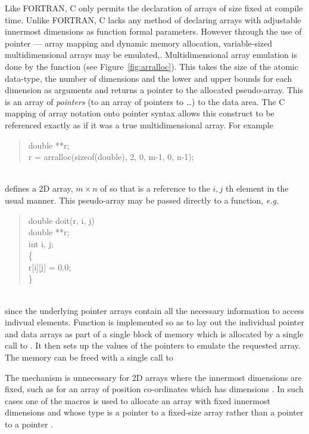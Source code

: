 \documentclass[a4paper,twoside]{report}
\newcommand{\eg}{\emph{e.g.}}
\begin{document}
Like FORTRAN, C only permits the declaration of arrays of size fixed
at compile time. Unlike FORTRAN, C lacks any method of declaring
arrays with adjustable innermost dimensions as function formal
parameters.  However through the use of pointer --- array mapping and
dynamic memory allocation, variable-sized multidimensional arrays may
be emulated\cite[p107]{kernighan:88},\cite[pp 20--23]{press:92C}.
Multidimensional array emulation is done by the function
 (see Figure~\ref{fig:arralloc}). This takes the size
of the atomic data-type, the number of dimensions and the lower and
upper bounds for each dimension as arguments and returns a pointer to
the allocated pseudo-array. This is an array of \emph{pointers} (to an
array of pointers to \ldots) to the data area.  The C mapping of array
notation onto pointer syntax allows this construct to be referenced
exactly as if it was a true multidimensional array. For example\\
\parbox{\textwidth}{%
\begin{quote}
  \Litf
double **r;\\
r = arralloc(sizeof(double), 2, 0, m-1, 0, n-1);
\end{quote}}\\
\noindent defines a 2D array, $m \times n$ of  so that
 is a reference to the $i, j$ th element in the usual
manner. This pseudo-array may be passed directly to a function, \eg\\
\parbox{\textwidth}{%
\begin{quote}
  \Litf
double doit(r, i, j)\\
double **r;\\
int    i, j;\\
\{\\
\hspace*{1cm} r[i][j] = 0.0;\\
\}
\end{quote}}\\
\noindent
since the underlying pointer arrays contain all the necessary
information to access indivual elements. Function  is
implemented so as to lay out the individual pointer and data arrays as
part of a single block of memory which is allocated by a single call
to . It then sets up the values of the pointers to
emulate the requested array. The memory can be freed with a single
call to 

The  mechanism is unnecessary for 2D arrays where
the innermost dimensions are fixed, such as for an array of position
co-ordinates which has dimensions \Lit{[n][3]}.  In such cases one
of the  macros is used to allocate an array
with fixed innermost dimensions and whose type is a pointer to a
fixed-size array  rather than a pointer to a
pointer .
\end{document}
